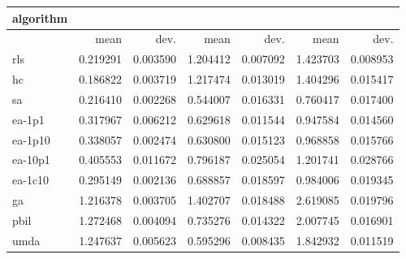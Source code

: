 \begin{tabular}{@{}l*{6}{>{{}}N{1}{2}}@{}}
\toprule
{algorithm} &  &  &  \\
\midrule
& {mean} & {dev.} & {mean} & {dev.} & {mean} & {dev.} \\
\midrule
rls & 0.219291 & 0.003590 & 1.204412 & 0.007092 & 1.423703 & 0.008953 \\
 hc & 0.186822 & 0.003719 & 1.217474 & 0.013019 & 1.404296 & 0.015417 \\
 sa & 0.216410 & 0.002268 & 0.544007 & 0.016331 & 0.760417 & 0.017400 \\
 ea-1p1 & 0.317967 & 0.006212 & 0.629618 & 0.011544 & 0.947584 & 0.014560 \\
 ea-1p10 & 0.338057 & 0.002474 & 0.630800 & 0.015123 & 0.968858 & 0.015766 \\
 ea-10p1 & 0.405553 & 0.011672 & 0.796187 & 0.025054 & 1.201741 & 0.028766 \\
 ea-1c10 & 0.295149 & 0.002136 & 0.688857 & 0.018597 & 0.984006 & 0.019345 \\
 ga & 1.216378 & 0.003705 & 1.402707 & 0.018488 & 2.619085 & 0.019796 \\
 pbil & 1.272468 & 0.004094 & 0.735276 & 0.014322 & 2.007745 & 0.016901 \\
 umda & 1.247637 & 0.005623 & 0.595296 & 0.008435 & 1.842932 & 0.011519 \\
 \bottomrule
\end{tabular}
